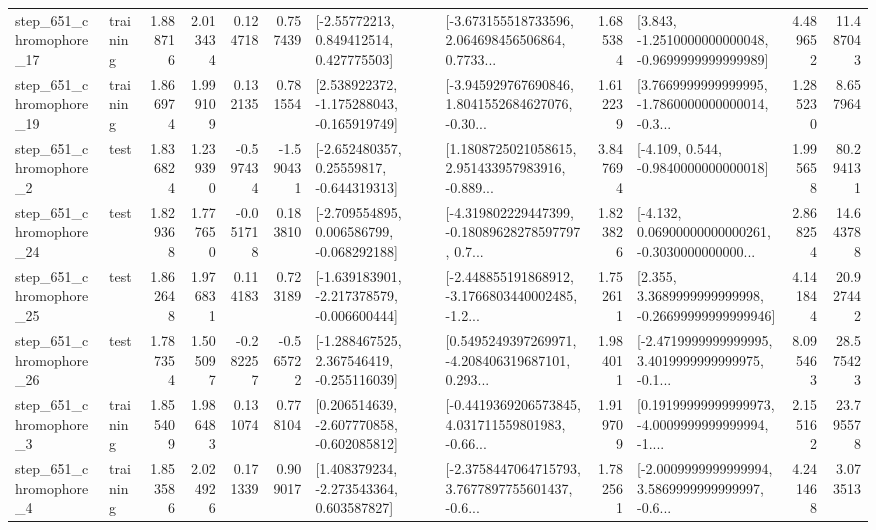 \begin{tabular}{llrrrrllrlrr}
  step\_651\_chromophore\_17 &  training &      1.888716 &    2.013434 &      0.124718 &  0.757439 &     [-2.55772213, 0.849412514, 0.427775503] &  [-3.673155518733596, 2.064698456506864, 0.7733... &       1.685384 &  [3.843, -1.2510000000000048, -0.9699999999999989] &            4.489652 &         11.487043 \\
  step\_651\_chromophore\_19 &  training &      1.866974 &    1.999109 &      0.132135 &  0.781554 &   [2.538922372, -1.175288043, -0.165919749] &  [-3.945929767690846, 1.8041552684627076, -0.30... &       1.612239 &  [3.7669999999999995, -1.7860000000000014, -0.3... &            1.285230 &          8.657964 \\
   step\_651\_chromophore\_2 &      test &      1.836824 &    1.239390 &     -0.597434 & -1.590431 &    [-2.652480357, 0.25559817, -0.644319313] &  [1.1808725021058615, 2.951433957983916, -0.889... &       3.847694 &               [-4.109, 0.544, -0.9840000000000018] &            1.995658 &         80.294131 \\
  step\_651\_chromophore\_24 &      test &      1.829368 &    1.777650 &     -0.051718 &  0.183810 &   [-2.709554895, 0.006586799, -0.068292188] &  [-4.319802229447399, -0.18089628278597797, 0.7... &       1.823826 &  [-4.132, 0.06900000000000261, -0.3030000000000... &            2.868254 &         14.643788 \\
  step\_651\_chromophore\_25 &      test &      1.862648 &    1.976831 &      0.114183 &  0.723189 &  [-1.639183901, -2.217378579, -0.006600444] &  [-2.448855191868912, -3.1766803440002485, -1.2... &       1.752611 &  [2.355, 3.3689999999999998, -0.26699999999999946] &            4.141844 &         20.927442 \\
  step\_651\_chromophore\_26 &      test &      1.787354 &    1.505097 &     -0.282257 & -0.565722 &   [-1.288467525, 2.367546419, -0.255116039] &  [0.5495249397269971, -4.208406319687101, 0.293... &       1.984011 &  [-2.4719999999999995, 3.4019999999999975, -0.1... &            8.095463 &         28.575423 \\
   step\_651\_chromophore\_3 &  training &      1.855409 &    1.986483 &      0.131074 &  0.778104 &   [0.206514639, -2.607770858, -0.602085812] &  [-0.4419369206573845, 4.031711559801983, -0.66... &       1.919709 &  [0.19199999999999973, -4.0009999999999994, -1.... &            2.155162 &         23.795578 \\
   step\_651\_chromophore\_4 &  training &      1.853586 &    2.024926 &      0.171339 &  0.909017 &    [1.408379234, -2.273543364, 0.603587827] &  [-2.3758447064715793, 3.7677897755601437, -0.6... &       1.782561 &  [-2.0009999999999994, 3.5869999999999997, -0.6... &            4.241468 &          3.073513 \\

\end{tabular}
